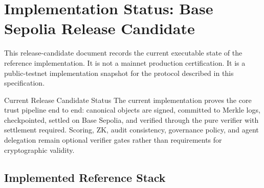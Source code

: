 \documentclass[11pt]{article}
\begin{document}
\tableofcontents
\newpage

\section{Implementation Status: Base Sepolia Release Candidate}

This release-candidate document records the current executable state of the reference implementation. It is not a mainnet production certification. It is a public-testnet implementation snapshot for the protocol described in this specification.

\begin{principlebox}{Current Release Candidate Status}
The current implementation proves the core trust pipeline end to end: canonical objects are signed, committed to Merkle logs, checkpointed, settled on Base Sepolia, and verified through the pure verifier with settlement required. Scoring, ZK, audit consistency, governance policy, and agent delegation remain optional verifier gates rather than requirements for cryptographic validity.
\end{principlebox}

\subsection{Implemented Reference Stack}
\end{document}
